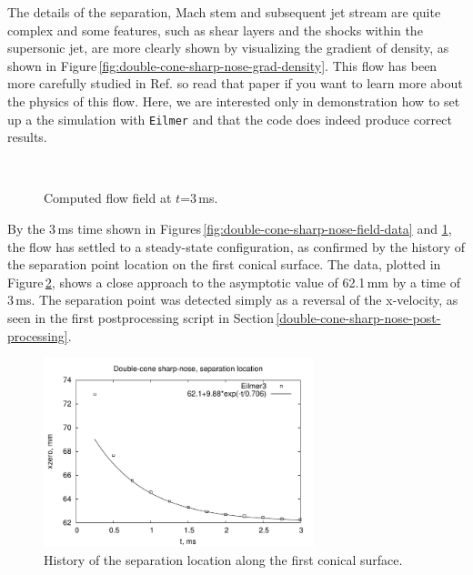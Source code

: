 \medskip
The details of the separation, Mach stem and subsequent jet stream 
are quite complex and some features, such as
shear layers and the shocks within the supersonic jet, are 
more clearly shown by visualizing the gradient of density, as shown in 
Figure\,\ref{fig:double-cone-sharp-nose-grad-density}.
This flow has been more carefully studied in Ref.\cite{nompelis_etal_2003a} so read that paper if
you want to learn more about the physics of this flow.
Here, we are interested only in demonstration how to set up a the simulation
with \texttt{Eilmer} and that the code does indeed produce correct results.

\begin{figure}[htb]
 \centering
 \\
 \caption{Computed flow field at $t$=3\,ms.}
 \label{fig:double-cone-sharp-nose-more-field-data}
\end{figure}


\medskip
By the 3\,ms time shown in Figures\,\ref{fig:double-cone-sharp-nose-field-data} 
and \ref{fig:double-cone-sharp-nose-more-field-data}, 
the flow has settled to a steady-state configuration,
as confirmed by the history of the separation point location on the first conical surface.
The data, plotted in Figure\,\ref{fig:double-cone-sharp-nose-separation-point},
shows a close approach to the asymptotic value of 62.1\,mm by a time of 3\,ms.
The separation point was detected simply as a reversal of the x-velocity, 
as seen in the first postprocessing script
in Section\,\ref{double-cone-sharp-nose-post-processing}.

\begin{figure}[htb]
 \centering
 \includegraphics[width=0.7\textwidth]{../2D/double-cone-sharp-nose/separation-location.pdf}
 \caption{History of the separation location along the first conical surface.}
 \label{fig:double-cone-sharp-nose-separation-point}
\end{figure}


